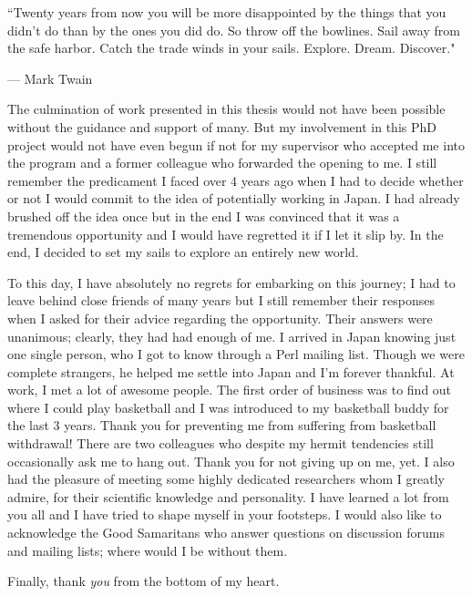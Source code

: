\epigraph{``Twenty years from now you will be more disappointed by the things that you didn't do than by the ones you did do. So throw off the bowlines. Sail away from the safe harbor. Catch the trade winds in your sails. Explore. Dream. Discover."}{--- \textup{Mark Twain}}

The culmination of work presented in this thesis would not have been possible without the guidance and support of many. But my involvement in this PhD project would not have even begun if not for my supervisor who accepted me into the program and a former colleague who forwarded the opening to me. I still remember the predicament I faced over 4 years ago when I had to decide whether or not I would commit to the idea of potentially working in Japan. I had already brushed off the idea once but in the end I was convinced that it was a tremendous opportunity and I would have regretted it if I let it slip by. In the end, I decided to set my sails to explore an entirely new world.

To this day, I have absolutely no regrets for embarking on this journey; I had to leave behind close friends of many years but I still remember their responses when I asked for their advice regarding the opportunity. Their answers were unanimous; clearly, they had had enough of me. I arrived in Japan knowing just one single person, who I got to know through a Perl mailing list. Though we were complete strangers, he helped me settle into Japan and I'm forever thankful. At work, I met a lot of awesome people. The first order of business was to find out where I could play basketball and I was introduced to my basketball buddy for the last 3 years. Thank you for preventing me from suffering from basketball withdrawal! There are two colleagues who despite my hermit tendencies still occasionally ask me to hang out. Thank you for not giving up on me, yet. I also had the pleasure of meeting some highly dedicated researchers whom I greatly admire, for their scientific knowledge and personality. I have learned a lot from you all and I have tried to shape myself in your footsteps. I would also like to acknowledge the Good Samaritans who answer questions on discussion forums and mailing lists; where would I be without them.

Finally, thank \textit{you} from the bottom of my heart.
